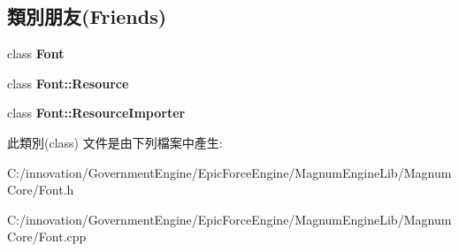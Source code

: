 \subsection*{類別朋友(Friends)}
\begin{DoxyCompactItemize}
\item 
class {\bfseries Font}\hypertarget{class_i_dream_sky_1_1_font_1_1_quad_ad564b94b59dc295de3dfc4415d95cca8}{}\label{class_i_dream_sky_1_1_font_1_1_quad_ad564b94b59dc295de3dfc4415d95cca8}

\item 
class {\bfseries Font\+::\+Resource}\hypertarget{class_i_dream_sky_1_1_font_1_1_quad_aed1576435da2fd6be67b0972d456c130}{}\label{class_i_dream_sky_1_1_font_1_1_quad_aed1576435da2fd6be67b0972d456c130}

\item 
class {\bfseries Font\+::\+Resource\+Importer}\hypertarget{class_i_dream_sky_1_1_font_1_1_quad_adcf31f02b1c16e69102f4d80f9a06dfd}{}\label{class_i_dream_sky_1_1_font_1_1_quad_adcf31f02b1c16e69102f4d80f9a06dfd}

\end{DoxyCompactItemize}


此類別(class) 文件是由下列檔案中產生\+:\begin{DoxyCompactItemize}
\item 
C\+:/innovation/\+Government\+Engine/\+Epic\+Force\+Engine/\+Magnum\+Engine\+Lib/\+Magnum\+Core/Font.\+h\item 
C\+:/innovation/\+Government\+Engine/\+Epic\+Force\+Engine/\+Magnum\+Engine\+Lib/\+Magnum\+Core/Font.\+cpp\end{DoxyCompactItemize}
